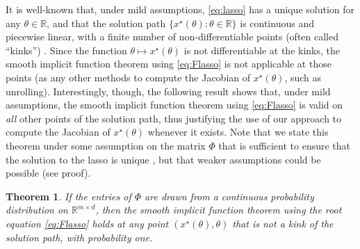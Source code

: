\documentclass{article}
\def\RR{{\mathbb R}}
\newtheorem{theorem}{Theorem}
\def\dataMatrix{\Phi}
\begin{document}
It is well-known that, under mild assumptions, \eqref{eq:lasso} has a unique solution for any $\theta\in\RR$, and that the solution path $\{x^\star(\theta):\theta\in\RR\}$ is continuous and piecewise linear, with a finite number of non-differentiable points (often called ``kinks'') \cite{Tibshirani2013lasso,Mairal12Complexity}. Since the function $\theta \mapsto x^\star(\theta)$ is not differentiable at the kinks, the smooth implicit function theorem using \eqref{eq:Flasso} is not applicable at those points (as any other methods to compute the Jacobian of $x^\star(\theta)$, such as unrolling). Interestingly, though, the following result shows that, under mild assumptions, the smooth implicit function theorem using \eqref{eq:Flasso} is valid on \emph{all} other points of the solution path, thus justifying the use of our approach to compute the Jacobian of $x^\star(\theta)$ whenever it exists. Note that we state this theorem under some assumption on the matrix $\dataMatrix$ that is sufficient to ensure that the solution to the lasso is unique \cite[Lemma 4]{Tibshirani2013lasso}, but that weaker assumptions could be possible (see proof).
\begin{theorem}\label{thm:lasso}
If the entries of $\dataMatrix$ are drawn from a continuous probability distribution on $\RR^{m\times d}$, then the smooth implicit function theorem using the root equation \eqref{eq:Flasso} holds at any point $(x^\star(\theta),\theta)$ that is not a kink of the solution path, with probability one.
\end{theorem}
\end{document}
